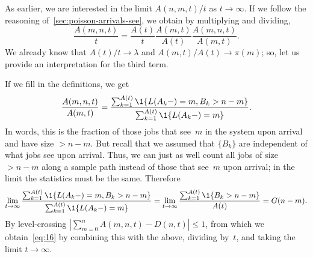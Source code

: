\documentclass[queueing-book.tex]{subfiles}
\begin{document}
As earlier, we are interested in the limit $A(n,m,t)/t$ as $t\to\infty$.
If we follow the reasoning of~\cref{sec:poisson-arrivals-see}, we obtain by multiplying and dividing,
\begin{equation}\label{eq:16}
 \frac{A(m,n,t)}t = \frac{A(t)}t \frac{A(m,t)}{A(t)}\frac{A(m,n,t)}{A(m,t)}.
\end{equation}
We already know that $A(t)/t\to\lambda$ and $A(m,t)/A(t)\to\pi(m)$; so, let us  provide  an interpretation for the third term.

If we fill in the definitions, we get
\begin{equation*}
 \frac{A(m,n,t)}{A(m,t)} =  \frac{\sum_{k=1}^{A(t)}\1{\L(A_k-) = m, B_k > n-m}}
{\sum_{k=1}^{A(t)}\1{\L(A_k-) = m}}.
\end{equation*}
In words, this is the fraction of those jobs that see~$m$ in the system upon arrival and have size $> n-m$.
But recall that we assumed that  $\{B_k\}$  are independent of what jobs see upon arrival.
Thus, we can just as well count all jobs of size $>n-m$ along a sample path instead of those that see~$m$ upon arrival; in the limit the statistics must be the same. Therefore
\begin{equation*}
\lim_{t\to\infty}  \frac{\sum_{k=1}^{A(t)}\1{\L(A_k-) = m, B_k > n-m}}
{\sum_{k=1}^{A(t)}\1{\L(A_k-) = m}} = \lim_{t\to\infty}
\frac{\sum_{k=1}^{A(t)}\1{B_k > n-m}}{A(t)}= G(n-m).
\end{equation*}
By level-crossing $\left|\sum_{m=0}^n A(m,n,t) - D(n,t)\right| \leq 1$, from which we obtain~\cref{eq:16} by combining this with the above, dividing by~$t$, and taking the limit $t\to\infty$.


\end{document}
